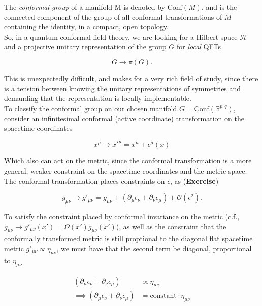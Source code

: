 \noindent The \textit{conformal group} of a manifold M is denoted by $\text{Conf}(M)$, and is the connected component of the group of all conformal transformations of $M$ containing the identity, in a compact, open topology. \\

\noindent So, in a quantum conformal field theory, we are looking for a Hilbert space $\mathcal{H}$ and a projective unitary representation of the group $G$ for \textit{local} QFTs

\begin{equation}
G \rightarrow \pi (G).
\end{equation}

\noindent This is unexpectedly difficult, and makes for a very rich field of study, since there is a tension between knowing the unitary representations of symmetries and demanding that the representation is locally implementable. \\

\noindent To classify the conformal group on our chosen manifold $G = \text{Conf} (\mathbb{R}^{p,q})$, consider an infinitesimal conformal (active coordinate) transformation on the spacetime coordinates

\begin{equation}
x^\mu \rightarrow x'^\mu = x^\mu +  \epsilon^\mu (x)
\end{equation}

\noindent Which also can act on the metric, since the conformal transformation is a more general, weaker constraint on the spacetime coordinates and the metric space. The conformal transformation places constraints on $\epsilon$, as (\textbf{Exercise})

\begin{equation}
g_{\mu\nu} \rightarrow g'_{\mu\nu} = g_{\mu\nu} + (\partial_\mu \epsilon_\nu + \partial_\nu \epsilon_\mu) + \mathcal{O} (\epsilon^2).
\end{equation}

\noindent To satisfy the constraint placed by conformal invariance on the metric (c.f., $g_{\mu\nu} \rightarrow g'_{\mu\nu} (x') = \Omega(x') g_{\mu\nu} (x')$), as well as the constraint that the conformally transformed metric is still proptional to the diagonal flat spacetime metric $g'_{\mu\nu} \propto \eta_{\mu\nu}$, we must have that the second term be diagonal, proportional to $\eta_{\mu\nu}$

\begin{align}
(\partial_\mu \epsilon_\nu + \partial_\nu \epsilon_\mu) &\propto \eta_{\mu\nu} \\
\implies (\partial_\mu \epsilon_\nu + \partial_\nu \epsilon_\mu) &= \text{constant} \cdot \eta_{\mu\nu}
\end{align}

